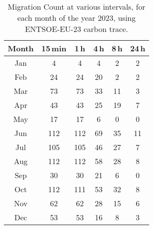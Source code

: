 \begin{table}
\centering
\caption{Migration Count at various intervals, for each month of the year 2023, using ENTSOE-EU-23 carbon trace.}
\begin{tabular}{|c|c|c|c|c|c|}
\hline
Month & 15\,min & 1\,h & 4\,h & 8\,h & 24\,h \\
\hline
Jan & 4 & 4 & 4 & 2 & 2 \\
Feb & 24 & 24 & 20 & 2 & 2 \\
Mar & 73 & 73 & 33 & 11 & 3 \\
Apr & 43 & 43 & 25 & 19 & 7 \\
May & 17 & 17 & 6 & 0 & 0 \\
Jun & 112 & 112 & 69 & 35 & 11 \\
Jul & 105 & 105 & 46 & 27 & 7 \\
Aug & 112 & 112 & 58 & 28 & 8 \\
Sep & 30 & 30 & 21 & 6 & 0 \\
Oct & 112 & 111 & 53 & 32 & 8 \\
Nov & 62 & 62 & 28 & 15 & 6 \\
Dec & 53 & 53 & 16 & 8 & 3 \\
\hline
\end{tabular}
\label{appendix:table:migration-count}
\end{table}